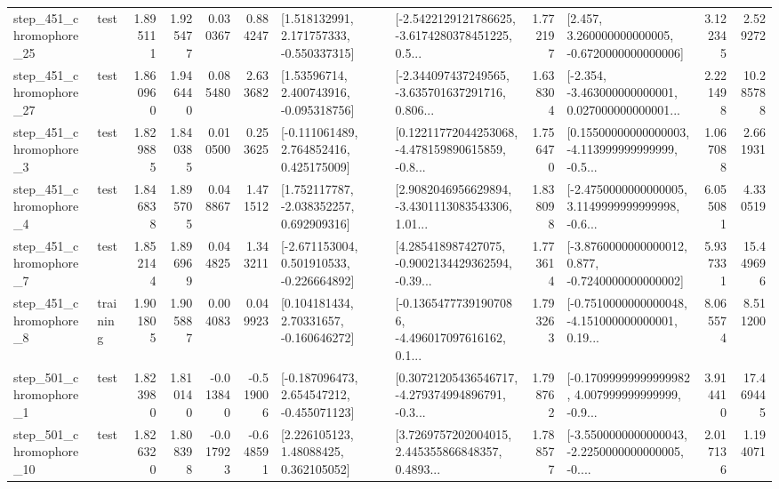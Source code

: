 \begin{tabular}{llrrrrllrlrr}
  step\_451\_chromophore\_25 &      test &      1.895111 &    1.925477 &      0.030367 &  0.884247 &    [1.518132991, 2.171757333, -0.550337315] &  [-2.5422129121786625, -3.6174280378451225, 0.5... &       1.772197 &    [2.457, 3.260000000000005, -0.6720000000000006] &            3.122345 &          2.529272 \\
  step\_451\_chromophore\_27 &      test &      1.860960 &    1.946440 &      0.085480 &  2.633682 &     [1.53596714, 2.400743916, -0.095318756] &  [-2.344097437249565, -3.635701637291716, 0.806... &       1.638304 &  [-2.354, -3.463000000000001, 0.027000000000001... &            2.221498 &         10.285788 \\
   step\_451\_chromophore\_3 &      test &      1.829885 &    1.840385 &      0.010500 &  0.253625 &    [-0.111061489, 2.764852416, 0.425175009] &  [0.12211772044253068, -4.478159890615859, -0.8... &       1.756470 &  [0.15500000000000003, -4.113999999999999, -0.5... &            1.067088 &          2.661931 \\
   step\_451\_chromophore\_4 &      test &      1.846838 &    1.895705 &      0.048867 &  1.471512 &    [1.752117787, -2.038352257, 0.692909316] &  [2.9082046956629894, -3.4301113083543306, 1.01... &       1.838098 &  [-2.4750000000000005, 3.1149999999999998, -0.6... &            6.055081 &          4.330519 \\
   step\_451\_chromophore\_7 &      test &      1.852144 &    1.896969 &      0.044825 &  1.343211 &   [-2.671153004, 0.501910533, -0.226664892] &  [4.285418987427075, -0.9002134429362594, -0.39... &       1.773614 &  [-3.8760000000000012, 0.877, -0.7240000000000002] &            5.937331 &         15.449696 \\
   step\_451\_chromophore\_8 &  training &      1.901805 &    1.905887 &      0.004083 &  0.049923 &     [0.104181434, 2.70331657, -0.160646272] &  [-0.13654777391907086, -4.496017097616162, 0.1... &       1.793263 &  [-0.7510000000000048, -4.151000000000001, 0.19... &            8.065574 &          8.511200 \\
   step\_501\_chromophore\_1 &      test &      1.823980 &    1.810140 &     -0.013840 & -0.519006 &   [-0.187096473, 2.654547212, -0.455071123] &  [0.30721205436546717, -4.279374994896791, -0.3... &       1.798762 &  [-0.17099999999999982, 4.007999999999999, -0.9... &            3.914410 &         17.469445 \\
  step\_501\_chromophore\_10 &      test &      1.826320 &    1.808398 &     -0.017923 & -0.648591 &      [2.226105123, 1.48088425, 0.362105052] &  [3.7269757202004015, 2.445355866848357, 0.4893... &       1.788577 &  [-3.5500000000000043, -2.2250000000000005, -0.... &            2.017136 &          1.194071 \\

\end{tabular}
